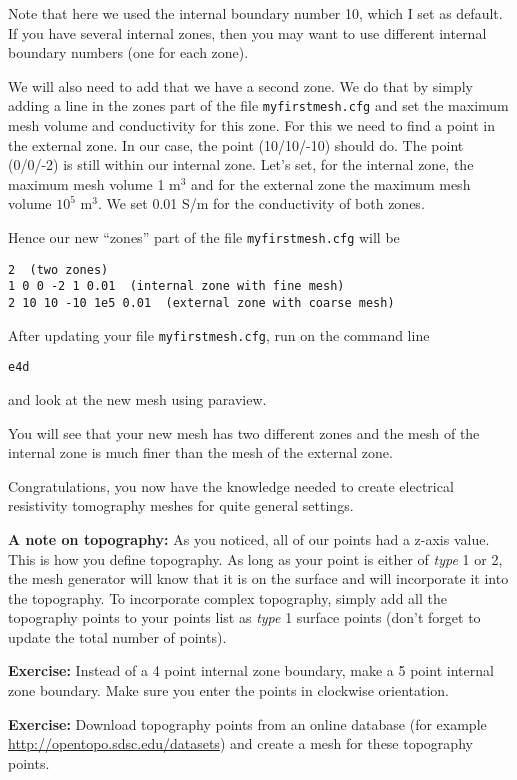 \documentclass[11pt]{article}
\begin{document}
Note that here we used the internal boundary number 10, which I set as
default. If you have several internal zones, then you may want to use
different internal boundary numbers (one for each zone).


We will also need to add that we have a second zone. We do that by
simply adding a line in the zones part of the file
\verb+myfirstmesh.cfg+ and set the maximum mesh volume and
conductivity for this zone. For this we need to find a point in the
external zone. In our case, the point (10/10/-10) should do. The point
(0/0/-2) is still within our internal zone. Let's set, for the
internal zone, the maximum mesh volume 1 m$^3$ and for the external zone
the maximum mesh volume $10^5$ m$^3$. We set 0.01 S/m for the
conductivity of both zones.

Hence our new ``zones'' part of the file \verb+myfirstmesh.cfg+ will
be

\verb+2  (two zones)+\\
\verb+1 0 0 -2 1 0.01  (internal zone with fine mesh)+\\
\verb+2 10 10 -10 1e5 0.01  (external zone with coarse mesh)+


After updating your file \verb+myfirstmesh.cfg+, run on the command
line

\qquad \verb+e4d+

and look at the new mesh using paraview.

You will see that your new mesh has two different zones and the mesh
of the internal zone is much finer than the mesh of the external zone.


Congratulations, you now have the knowledge needed to create
electrical resistivity tomography meshes for quite general settings.

\textbf{A note on topography:} As you noticed, all of our points had a
z-axis value. This is how you define topography. As long as your point
is either of \emph{type} 1 or 2, the mesh generator will know that it
is on the surface and will incorporate it into the topography. To
incorporate complex topography, simply add all the topography points
to your points list as \emph{type} 1 surface points (don't forget to
update the total number of points).

\textbf{Exercise:} Instead of a 4 point internal zone boundary, make a
5 point internal zone boundary. Make sure you enter the points in
clockwise orientation.

\textbf{Exercise:} Download topography points from an online database
(for example \url{http://opentopo.sdsc.edu/datasets}) and create a
mesh for these topography points.
\end{document}
